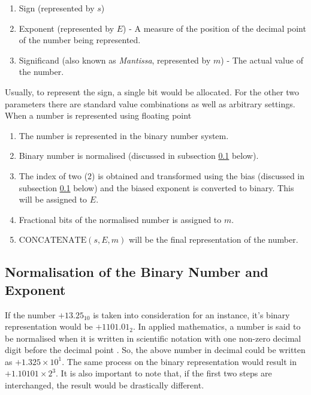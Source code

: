 \begin{enumerate}
    \item Sign (represented by $s$)
    \item Exponent (represented by $E$) - A measure of the position of the decimal point of the number being represented.
    \item Significand (also known as \textit{Mantissa}, represented by $m$) - The actual value of the number.
\end{enumerate}

Usually, to represent the sign, a single bit would be allocated. For the other two parameters there are standard value combinations as well as arbitrary settings. When a number is represented using floating point

\begin{enumerate}
    \item The number is represented in the binary number system.
    \item Binary number is normalised (discussed in subsection \ref{sec_norm_exp} below).
    \item The index of two (2) is obtained and transformed using the bias (discussed in subsection \ref{sec_norm_exp} below) and the biased exponent is converted to binary. This will be assigned to $E$.
    \item Fractional bits of the normalised number is assigned to $m$.
    \item $\text{CONCATENATE}(s, E, m)$ will be the final representation of the number.
\end{enumerate}

\subsection{Normalisation of the Binary Number and Exponent}\label{sec_norm_exp}

If the number $+13.25_{10}$ is taken into consideration for an instance, it's binary representation would be $+1101.01_2$. In applied mathematics, a number is said to be normalised when it is written in scientific notation with one non-zero decimal digit before the decimal point \cite{bk_math_of_astro}. So, the above number in decimal could be written as $+1.325 \times 10^1$. The same process on the binary representation would result in $+1.10101 \times 2^3$. It is also important to note that, if the first two steps are interchanged, the result would be drastically different.

